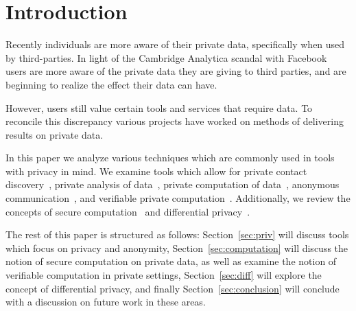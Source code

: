 \section{Introduction} \label{sec:intro}
Recently individuals are more aware of their private data, specifically when
used by third-parties. In light of the Cambridge Analytica scandal with
Facebook~\cite{granville_2018, welch_2018} users are more aware of the private
data they are giving to third parties, and are beginning to realize the effect
their data can have.

However, users still value certain tools and services that require data. To
reconcile this discrepancy various projects have worked on methods of
delivering results on private data.

In this paper we analyze various techniques which are commonly used in tools
with privacy in mind. We examine tools which allow for private contact
discovery~\cite{demmler2018pir, borisov2015dp5}, private analysis of
data~\cite{erlingsson2014rappor}, private computation of
data~\cite{bogetoft2009secure}, anonymous
communication~\cite{wolinsky2012dissent}, and verifiable private
computation~\cite{ben2013snarks, parno2013pinocchio}. Additionally, we review
the concepts of secure computation~\cite{yao1982protocols, lindell2005secure}
and differential privacy~\cite{dwork2008differential}.

The rest of this paper is structured as follows: Section~\ref{sec:priv} will
discuss tools which focus on privacy and anonymity,
Section~\ref{sec:computation} will discuss the notion of secure computation on
private data, as well as examine the notion of verifiable computation in private
settings, Section~\ref{sec:diff} will explore the concept of differential
privacy, and finally Section~\ref{sec:conclusion} will conclude with a
discussion on future work in these areas.